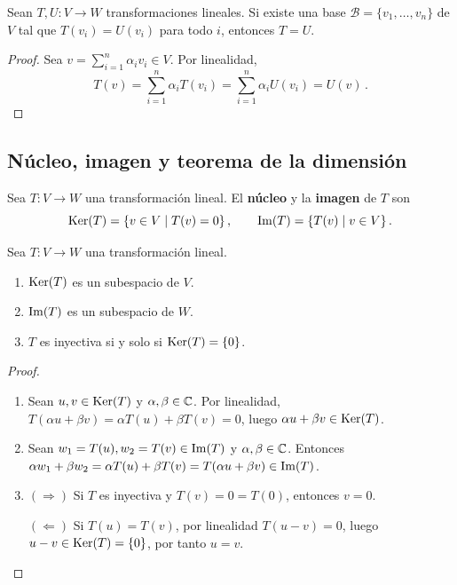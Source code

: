 \begin{prop}
  \label{prop:TL-unicidad}
  Sean $T,U\colon V\to W$ transformaciones lineales. Si existe una base $\mathcal{B}=\{v_1,\ldots,v_n\}$ de $V$ tal que $T(v_i)=U(v_i)$ para todo $i$, entonces $T=U$.
\end{prop}
\begin{proof}
  Sea $v=\sum_{i=1}^n\alpha_i v_i\in V$. Por linealidad,
  \[
    T(v) = \sum_{i=1}^n\alpha_i T(v_i) = \sum_{i=1}^n\alpha_i U(v_i) = U(v)\,.
  \]
\end{proof}

\subsection{Núcleo, imagen y teorema de la dimensión}

\begin{defi}
  Sea $T\colon V\to W$ una transformación lineal. El \textbf{núcleo} y la \textbf{imagen} de $T$ son
  \[
    \operatorname{Ker}(T) = \{v\in V \mid T(v)=0\}\,,\qquad \operatorname{Im}(T) = \{T(v)\mid v\in V\}\,.
  \]
\end{defi}

\begin{prop}
  \label{prop:propiedadesKerIma}
  Sea $T\colon V\to W$ una transformación lineal.
  \begin{enumerate}
    \item $\operatorname{Ker}(T)$ es un subespacio de $V$.
    \item $\operatorname{Im}(T)$ es un subespacio de $W$.
    \item $T$ es inyectiva si y solo si $\operatorname{Ker}(T)=\{0\}$.
  \end{enumerate}
\end{prop}
\begin{proof}
  \begin{enumerate}
    \item Sean $u,v\in\operatorname{Ker}(T)$ y $\alpha,\beta\in\mathbb{C}$. Por linealidad, $T(\alpha u+\beta v)=\alpha T(u)+\beta T(v)=0$, luego $\alpha u+\beta v\in\operatorname{Ker}(T)$.
    \item Sean $w_1=T(u),w_2=T(v)\in\operatorname{Im}(T)$ y $\alpha,\beta\in\mathbb{C}$. Entonces $\alpha w_1+\beta w_2 = \alpha T(u)+\beta T(v)=T(\alpha u+\beta v)\in\operatorname{Im}(T)$.
    \item $(\Rightarrow)$ Si $T$ es inyectiva y $T(v)=0=T(0)$, entonces $v=0$.

          $(\Leftarrow)$ Si $T(u)=T(v)$, por linealidad $T(u-v)=0$, luego $u-v\in\operatorname{Ker}(T)=\{0\}$, por tanto $u=v$.
  \end{enumerate}
\end{proof}

